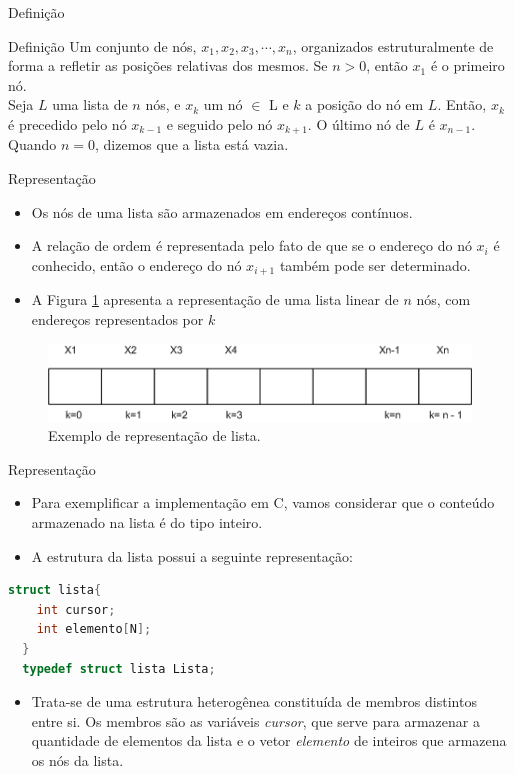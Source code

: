 \begin{frame}{Definição}
     \begin{block}{Definição}
       Um conjunto de nós, $x_1, x_2, x_3, \cdots, x_n$, organizados estruturalmente de forma a refletir as posições relativas dos mesmos. Se $n > 0$, então $x_1$ é o primeiro nó. \\
       Seja $L$ uma lista de $n$ nós, e $x_k$ um nó $\in$ L e $k$ a posição do nó em $L$. Então, $x_k$ é precedido pelo nó $x_{k-1}$ e seguido pelo nó $x_{k+1}$. O último nó de $L$ é $x_{n-1}$. Quando $n = 0$, dizemos que a lista está vazia.
     \end{block}     
\end{frame}

\begin{frame}{Representação}
\begin{itemize}
	\item Os nós de uma lista são armazenados em endereços contínuos.
	\item A relação de ordem é representada pelo fato de que se o endereço do 
	nó $x_i$ é conhecido, então o endereço do nó $x_{i+1}$ também pode ser determinado. 	
	\item A Figura \ref{fig:lista-linear-repre} apresenta a representação de
	 uma lista linear de $n$ nós, com endereços representados por $k$
\end{itemize}

\begin{figure}[hb]
	\centering
		\includegraphics[width=.6\textwidth]{figs/fig_listas/lista-linear.png}			
			\caption{Exemplo de representação de lista.}	
				\label{fig:lista-linear-repre}
			\end{figure} 
\end{frame}

\begin{frame}[fragile,c]{Representação}
\begin{itemize}
	\item Para exemplificar a implementação em C, vamos considerar que o conteúdo armazenado na lista é do tipo inteiro.
	\item A estrutura da lista possui a seguinte representação:	
\end{itemize}
\begin{lstlisting}[language=C]
  struct lista{
    int cursor;
    int elemento[N];
  }
  typedef struct lista Lista;
\end{lstlisting}
\begin{itemize}
	\item Trata-se de uma estrutura heterogênea constituída de membros distintos entre si. Os membros são as variáveis \alert{\textit{cursor}}, que serve para armazenar a quantidade de elementos da lista e o vetor \alert{\textit{elemento}} de inteiros que armazena os nós da lista.
\end{itemize}
\end{frame}

